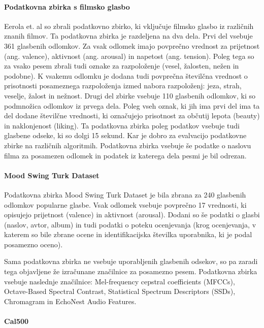 \documentclass[a4paper, 12pt]{book}
\begin{document}
{\paragraph{Podatkovna zbirka s filmsko glasbo}

Eerola et. al \cite{Eerola2010} so zbrali podatkovno zbirko, ki vključuje filmsko glasbo iz različnih znanih filmov. Ta podatkovna zbirka je razdeljena na dva dela. Prvi del vsebuje 361 glasbenih odlomkov. Za vsak odlomek imajo povprečno vrednost za prijetnost (ang. valence), aktivnost (ang. arousal) in  napetost (ang. tension). Poleg tega so za vsako pesem zbrali tudi oznake za razpoloženje (vesel, žalosten, nežen in podobne). K vsakemu odlomku je dodana tudi povprečna številčna vrednost o prisotnosti posameznega razpoloženja izmed nabora razpoloženj: jeza, strah, veselje, žalost in nežnost. Drugi del zbirke vsebuje 110 glasbenih odlomkov, ki so podmnožica odlomkov iz prvega dela. Poleg vseh oznak, ki jih ima prvi del ima ta del dodane številčne vrednosti, ki označujejo prisotnost za občutij lepota (beauty) in naklonjenost (liking). Ta podatkovna zbirka poleg podatkov vsebuje tudi glasbene odseke, ki so dolgi 15 sekund. Kar je dobro za evalvacijo podatkovne zbirke na različnih algoritmih. Podatkovna zbirka vsebuje še podatke o naslovu filma za posamezen odlomek in podatek iz katerega dela pesmi je bil odrezan. 

\paragraph{Mood Swing Turk Dataset}

Podatkovna zbirka Mood Swing Turk Dataset \cite{schmidt2011modeling} je bila zbrana za 240 glasbenih odlomkov popularne glasbe. Vsak odlomek vsebuje povprečno 17 vrednosti, ki opisujejo prijetnost (valence) in aktivnost (arousal). Dodani so še podatki o glasbi (naslov, avtor, album) in tudi podatki o poteku ocenjevanja (krog ocenjevanja, v katerem so bile zbrane ocene in identifikacijska številka uporabnika, ki je podal posamezno oceno). 

Sama podatkovna zbirka ne vsebuje uporabljenih glasbenih odsekov, so pa zaradi tega objavljene že izračunane značilnice za posamezno pesem. Podatkovna zbirka vsebuje naslednje značilnice: Mel-frequency cepstral coefficients (MFCCs), Octave-Based Spectral Contrast, Statistical Spectrum Descriptors (SSDs), Chromagram in EchoNest Audio Features.

\paragraph{Cal500}

}
\end{document}
